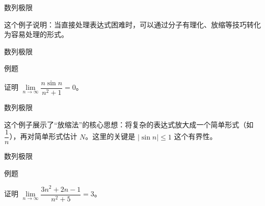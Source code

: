 \documentclass[aspectratio=169,10pt,fontset=fandol]{ctexbeamer}
\newenvironment{custom}[1]{\par\noindent\textbf{#1}\quad}{\par\vspace{0.8em}}
\begin{document}
\begin{frame}[t,fragile]{数列极限}
\normalsize
{\normalsize
这个例子说明：当直接处理表达式困难时，可以通过分子有理化、放缩等技巧转化为容易处理的形式。


}
\end{frame}
\begin{frame}[t,fragile]{数列极限}
\normalsize
\begin{block}{例题}
{\normalsize
证明 \(\lim\limits_{n\to\infty} \dfrac{n \sin n}{n^2 + 1} = 0\)。


}
\end{block}
\end{frame}
\begin{frame}[t,fragile]{数列极限}
\normalsize
{\normalsize
这个例子展示了“放缩法”的核心思想：将复杂的表达式放大成一个简单形式（如 \(\dfrac{1}{n}\)），再对简单形式估计 \(N\)。这里的关键是 \(|\sin n| \leq 1\) 这个有界性。


}
\end{frame}
\begin{frame}[t,fragile]{数列极限}
\normalsize
\begin{block}{例题}
{\normalsize
证明 \(\lim\limits_{n\to\infty} \dfrac{3n^2 + 2n - 1}{n^2 + 5} = 3\)。


}
\end{block}
\end{frame}
\end{document}
